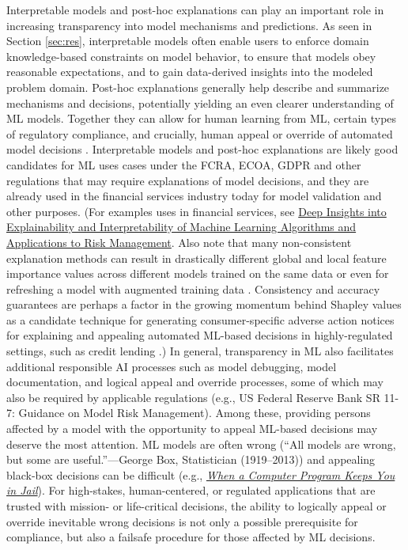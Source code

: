 \documentclass[information,article,accept,moreauthors,pdftex]{Definitions/mdpi}
\begin{document}
Interpretable models and post-hoc explanations can play an important role in increasing transparency into model mechanisms and predictions. As seen in Section \ref{sec:res}, interpretable models often enable users to enforce domain knowledge-based constraints on model behavior, to ensure that models obey reasonable expectations, and to gain data-derived insights into the modeled problem domain. Post-hoc explanations generally help describe and summarize mechanisms and decisions, potentially yielding an even clearer understanding of ML models. Together they can allow for human learning from ML, certain types of regulatory compliance, and crucially, human appeal or override of automated model decisions \cite{art_and_sci}. Interpretable models and post-hoc explanations are likely good candidates for ML uses cases under the FCRA, ECOA, GDPR and other regulations that may require explanations of model decisions, and they are already used in the financial services industry today for model validation and other purposes.
(For examples uses in financial services, see
\href{https://ww2.amstat.org/meetings/jsm/2019/onlineprogram/AbstractDetails.cfm?abstractid=303053}
{Deep Insights into Explainability and Interpretability of Machine Learning Algorithms and Applications to Risk Management}.  Also note that many non-consistent explanation methods can result in drastically different global and local feature importance values across different models trained on the same data or even for refreshing a model with augmented training data \cite{molnar}. Consistency and accuracy guarantees are perhaps a factor in the growing momentum behind Shapley values as a candidate technique for generating consumer-specific adverse action notices for explaining and appealing automated ML-based decisions in highly-regulated settings, such as credit lending \cite{bracke2019machine}.) In general, transparency in ML also facilitates additional responsible AI processes such as model debugging, model documentation, and logical appeal and override processes, some of which may also be required by applicable regulations (e.g., US Federal Reserve Bank SR 11-7: Guidance on Model Risk Management).
 Among these, providing persons affected by a model with the opportunity to appeal ML-based decisions may deserve the most attention. ML models are often wrong (``All models are wrong, but some are useful.''---George Box, Statistician (1919--2013))
 and appealing black-box decisions can be difficult (e.g.,
 \href{https://www.nytimes.com/2017/06/13/opinion/how-computers-are-harming-criminal-justice.html}
 {\textit{When a Computer Program Keeps You in Jail}}). For high-stakes, human-centered, or regulated applications that are trusted with mission- or life-critical decisions, the ability to logically appeal or override inevitable wrong decisions is not only a possible prerequisite for compliance, but also a failsafe procedure for those affected by ML decisions.
\end{document}
